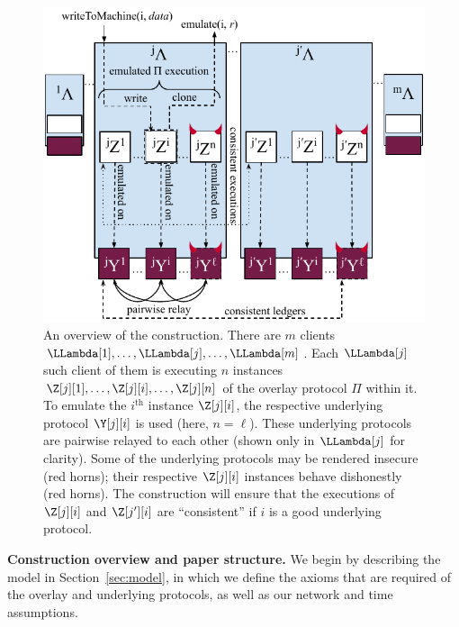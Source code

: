 \begin{figure}
    \centering
    \includegraphics[width=0.9 \textwidth,keepaspectratio]{figures/rollerblade-overview.pdf}
    \caption{An overview of the \rollerblade construction.
             There are $m$ \rollerblade clients $\LLambda[1], \ldots, \LLambda[j], \ldots, \LLambda[m]$.
             Each $\LLambda[j]$ such client of them is executing $n$ instances $\Z[j][1], \ldots, \Z[j][i], \ldots, \Z[j][n]$
             of the overlay protocol $\Pi$ within it.
             To emulate the $i^\text{th}$ instance $\Z[j][i]$, the respective
             underlying protocol $\Y[j][i]$ is used (here, $n = \ell$).
             These underlying protocols are pairwise relayed to each other
             (shown only in $\LLambda[j]$ for clarity).
             Some of the underlying
             protocols may be rendered insecure (red horns); their respective
             $\Z[j][i]$ instances behave dishonestly (red horns).
             The construction will ensure that the executions of $\Z[j][i]$ and
             $\Z[j'][i]$ are ``consistent'' if $i$ is a good underlying protocol.}
    \label{fig.rollerblade-overview}
\end{figure}

\noindent
\textbf{Construction overview and paper structure.}
We begin by describing the model in Section~\ref{sec:model}, in which
we define the axioms that are required of the overlay and underlying protocols,
as well as our network and time assumptions.

